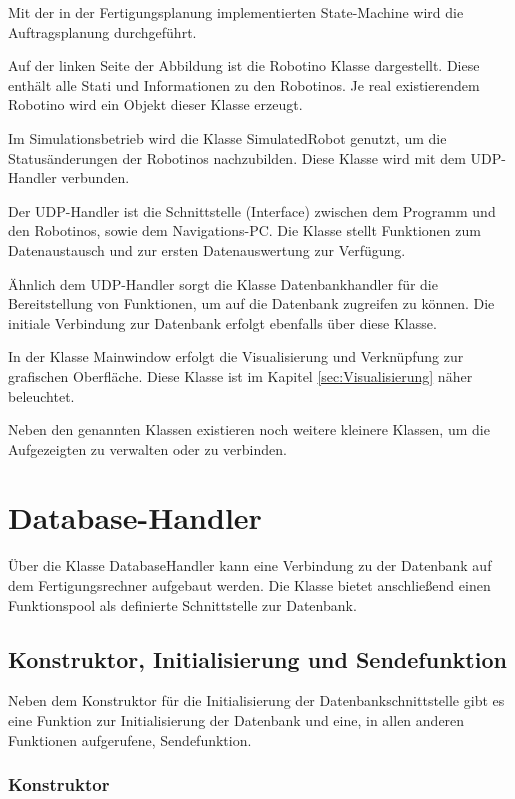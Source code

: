 Mit der in der Fertigungsplanung implementierten State-Machine wird die Auftragsplanung durchgeführt.

Auf der linken Seite der Abbildung ist die Robotino Klasse dargestellt. Diese enthält alle Stati und Informationen zu den Robotinos. Je real existierendem Robotino wird ein Objekt dieser Klasse erzeugt.

Im Simulationsbetrieb wird die Klasse SimulatedRobot genutzt, um die Statusänderungen der Robotinos nachzubilden. Diese Klasse wird mit dem UDP-Handler verbunden. 

Der UDP-Handler ist die Schnittstelle (Interface) zwischen dem Programm und den Robotinos, sowie dem Navigations-PC. Die Klasse stellt Funktionen zum Datenaustausch und zur ersten Datenauswertung zur Verfügung. 

Ähnlich dem UDP-Handler sorgt die Klasse Datenbankhandler für die Bereitstellung von Funktionen, um auf die Datenbank zugreifen zu können. Die initiale Verbindung zur Datenbank erfolgt ebenfalls über diese Klasse.

In der Klasse Mainwindow erfolgt die Visualisierung und Verknüpfung zur grafischen Oberfläche. Diese Klasse ist im Kapitel \ref{sec:Visualisierung} näher beleuchtet.

Neben den genannten Klassen existieren noch weitere kleinere Klassen, um die Aufgezeigten zu verwalten oder zu verbinden. 

\section{Database-Handler}
\label{sec:Databasehandler}

Über die Klasse DatabaseHandler kann eine Verbindung zu der Datenbank auf dem Fertigungsrechner aufgebaut werden. Die Klasse bietet anschließend einen Funktionspool als definierte Schnittstelle zur Datenbank.

\subsection{Konstruktor, Initialisierung und Sendefunktion}

Neben dem Konstruktor für die Initialisierung der Datenbankschnittstelle gibt es eine Funktion zur Initialisierung der Datenbank und eine, in allen anderen Funktionen aufgerufene, Sendefunktion. 

\subsubsection{Konstruktor}

